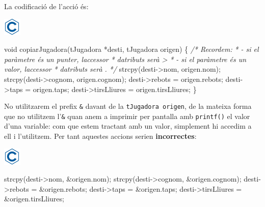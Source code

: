 \documentclass[]{book}
\newenvironment{Shaded}{\begin{snugshade}}{\end{snugshade}}
\newcommand{\CommentTok}[1]{\textcolor[rgb]{0.56,0.35,0.01}{\textit{#1}}}
\newcommand{\DataTypeTok}[1]{\textcolor[rgb]{0.13,0.29,0.53}{#1}}
\newcommand{\NormalTok}[1]{#1}
\begin{document}
La codificació de l'acció és:

\includegraphics{./img/c.png}

\begin{Shaded}
\begin{Highlighting}[]
\DataTypeTok{void}\NormalTok{ copiarJugadora(tJugadora *desti, tJugadora origen) \{}
    \CommentTok{/* Recordem: }
\CommentTok{     * {-} si el paràmetre és un punter, l\textquotesingle{}accessor }
\CommentTok{     *   d\textquotesingle{}atributs serà \textquotesingle{}{-}\textgreater{}\textquotesingle{}}
\CommentTok{     * {-} si el paràmetre és un valor, l\textquotesingle{}accessor}
\CommentTok{     *   d\textquotesingle{}atributs serà \textquotesingle{}.\textquotesingle{}}
\CommentTok{     */}
\NormalTok{    strcpy(desti{-}\textgreater{}nom, origen.nom);}
\NormalTok{    strcpy(desti{-}\textgreater{}cognom, origen.cognom);}
\NormalTok{    desti{-}\textgreater{}rebots = origen.rebots;}
\NormalTok{    desti{-}\textgreater{}taps = origen.taps;}
\NormalTok{    desti{-}\textgreater{}tirsLliures = origen.tirsLliures;}
\NormalTok{\}}
\end{Highlighting}
\end{Shaded}

No utilitzarem el prefix \texttt{\&} davant de la \texttt{tJugadora\ origen}, de la mateixa forma que no utilitzem l'\texttt{\&} quan anem a imprimir per pantalla amb \texttt{printf()} el valor d'una variable: com que estem tractant amb un valor, simplement hi accedim a ell i l'utilitzem. Per tant aquestes accions serien \textbf{incorrectes}:

\includegraphics{./img/c.png}

\begin{Shaded}
\begin{Highlighting}[]
\NormalTok{    strcpy(desti{-}\textgreater{}nom, \&origen.nom);}
\NormalTok{    strcpy(desti{-}\textgreater{}cognom, \&origen.cognom);}
\NormalTok{    desti{-}\textgreater{}rebots = \&origen.rebots;}
\NormalTok{    desti{-}\textgreater{}taps = \&origen.taps;}
\NormalTok{    desti{-}\textgreater{}tirsLliures = \&origen.tirsLliures;}
\end{Highlighting}
\end{Shaded}
\end{document}
